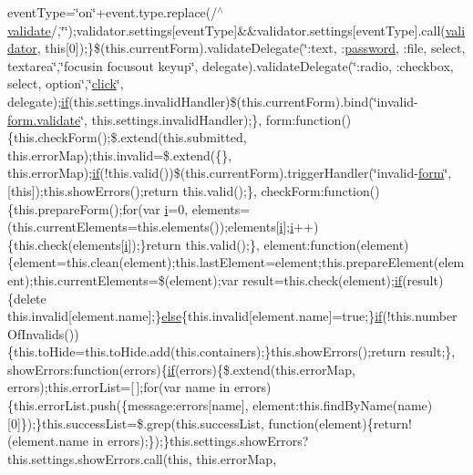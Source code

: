 \begin{DoxyCompactItemize}
event\+Type=\char`\"{}on\char`\"{}+event.\+type.\+replace(/$^\wedge$\hyperlink{jquery_8unobtrusive-ajax_8js_adf8db01fbef50de60d1968bb75c8181c}{validate}/,\char`\"{}\char`\"{});validator.\+settings\mbox{[}event\+Type\mbox{]}\&\&validator.\+settings\mbox{[}event\+Type\mbox{]}.call(\hyperlink{_scripts_2jquery_8validate_8js_a2dc8272bb221cdffcccbd20db038f172}{validator}, this\mbox{[}0\mbox{]});\}\$(this.\+current\+Form).validate\+Delegate(\char`\"{}\+:text, \+:\hyperlink{login_8js_ad0d7f16f1a4d203897a62cee1ce3f2e3}{password}, \+:file, select, textarea\char`\"{},\char`\"{}focusin focusout keyup\char`\"{}, delegate).validate\+Delegate(\char`\"{}\+:radio, \+:checkbox, select, option\char`\"{},\char`\"{}\hyperlink{login_8js_a2c7f8b6219185f8af7ec9cece8bc41e3}{click}\char`\"{}, delegate);\hyperlink{_scripts_2respond_8min_8js_a93851d60dd037a83509a1757b9ee7b66}{if}(this.\+settings.\+invalid\+Handler)\$(this.\+current\+Form).bind(\char`\"{}invalid-\/\hyperlink{jquery_8unobtrusive-ajax_8js_adf8db01fbef50de60d1968bb75c8181c}{form.\+validate}\char`\"{}, this.\+settings.\+invalid\+Handler);\}, form\+:function()\{this.\+check\+Form();\$.extend(this.\+submitted, this.\+error\+Map);this.\+invalid=\$.extend(\{\}, this.\+error\+Map);\hyperlink{_scripts_2respond_8min_8js_a93851d60dd037a83509a1757b9ee7b66}{if}(!this.\+valid())\$(this.\+current\+Form).trigger\+Handler(\char`\"{}invalid-\/\hyperlink{login_8js_acfb5ebf8920e47b6c6d297e6ca2a6ce0}{form}\char`\"{}, \mbox{[}this\mbox{]});this.\+show\+Errors();return this.\+valid();\}, check\+Form\+:function()\{this.\+prepare\+Form();for(var \hyperlink{jquery_8unobtrusive-ajax_8min_8js_a84da5ff1aa6008a770fb28040f6b0569}{i}=0, elements=(this.\+current\+Elements=this.\+elements());elements\mbox{[}\hyperlink{jquery_8unobtrusive-ajax_8min_8js_a84da5ff1aa6008a770fb28040f6b0569}{i}\mbox{]};\hyperlink{jquery_8unobtrusive-ajax_8min_8js_a84da5ff1aa6008a770fb28040f6b0569}{i}++)\{this.\+check(elements\mbox{[}\hyperlink{jquery_8unobtrusive-ajax_8min_8js_a84da5ff1aa6008a770fb28040f6b0569}{i}\mbox{]});\}return this.\+valid();\}, element\+:function(element)\{element=this.\+clean(element);this.\+last\+Element=element;this.\+prepare\+Element(element);this.\+current\+Elements=\$(element);var result=this.\+check(element);\hyperlink{_scripts_2respond_8min_8js_a93851d60dd037a83509a1757b9ee7b66}{if}(result)\{delete this.\+invalid\mbox{[}element.\+name\mbox{]};\}\hyperlink{_scripts_2jquery_8validate_8js_a0544c3fe466e421738dae463968b70ba}{else}\{this.\+invalid\mbox{[}element.\+name\mbox{]}=true;\}\hyperlink{_scripts_2respond_8min_8js_a93851d60dd037a83509a1757b9ee7b66}{if}(!this.\+number\+Of\+Invalids())\{this.\+to\+Hide=this.\+to\+Hide.\+add(this.\+containers);\}this.\+show\+Errors();return result;\}, show\+Errors\+:function(errors)\{\hyperlink{_scripts_2respond_8min_8js_a93851d60dd037a83509a1757b9ee7b66}{if}(errors)\{\$.extend(this.\+error\+Map, errors);this.\+error\+List=\mbox{[}$\,$\mbox{]};for(var name in errors)\{this.\+error\+List.\+push(\{message\+:errors\mbox{[}name\mbox{]}, element\+:this.\+find\+By\+Name(name)\mbox{[}0\mbox{]}\});\}this.\+success\+List=\$.grep(this.\+success\+List, function(element)\{return!(element.\+name in errors);\});\}this.\+settings.\+show\+Errors?this.\+settings.\+show\+Errors.\+call(this, this.\+error\+Map, 
\end{DoxyCompactItemize}
